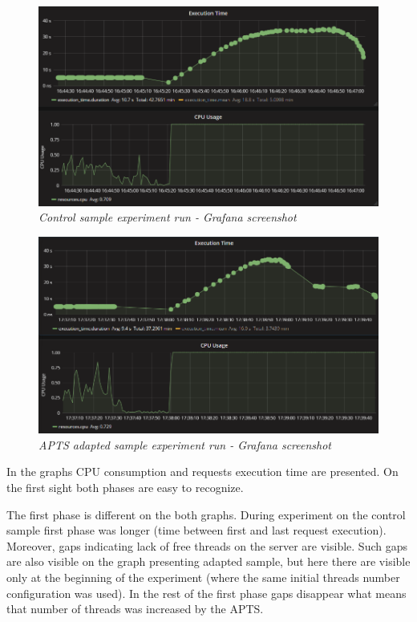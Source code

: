 \documentclass[10pt,a4paper]{article}
\begin{document}
\begin{figure}[!htb]
\centering
\includegraphics[width=1\textwidth]{threadsCtrl}
\caption{\textit{Control sample experiment run - Grafana screenshot}} \label{figure:threads:screen:control}
\end{figure}
\begin{figure}[!htb]
\centering
\includegraphics[width=1\textwidth]{threadsEval}
\caption{\textit{APTS adapted sample experiment run - Grafana screenshot}} \label{figure:threads:screen:adapted}
\end{figure}

In the graphs CPU consumption and requests execution time are presented. On the first sight both phases are easy to recognize.

The first phase is different on the both graphs. During experiment on the control sample first phase was longer (time between first and last request execution). Moreover, gaps indicating lack of free threads on the server are visible. Such gaps are also visible on the graph presenting adapted sample, but here there are visible only at the beginning of the experiment (where the same initial threads number configuration was used). In the rest of the first phase gaps disappear what means that number of threads was increased by the APTS. 
\end{document}
